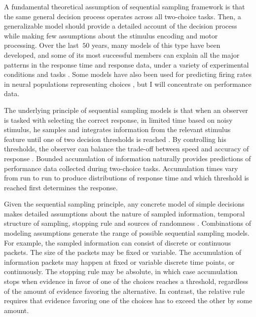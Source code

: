 \documentclass[12pt]{article}
\begin{document}
	A fundamental theoretical assumption of sequential sampling framework is that the same general decision process operates across all two-choice tasks. Then, a generalizable model should provide a detailed account of the decision process while making few assumptions about the stimulus encoding and motor processing. Over the last $~50$ years, many models of this type have been developed, and some of its most successful members can explain all the major patterns in the response time and response data, under a variety of experimental conditions and tasks \citep{Sto1960,Rat1978,RatTue2002,Smi1995,UshMcc2001,BroHea2008}. Some models have also been used for predicting firing rates in neural populations representing choices \citep{RatChe2003,RatHas2011,SmiRat2004,Bog2007}, but I will concentrate on performance data.
    
	The underlying principle of sequential sampling models is that when an observer is tasked with selecting the correct response, in limited time based on noisy stimulus, he samples and integrates information from the relevant stimulus feature until one of two decision thresholds is reached \citep{Sto1960,Edw1965,Pik1973,Rat1978,UshMcc2001,RatSmi2004,SmiRat2004,RatMck2008,Wag2009,Luc1986,TowAsh1983,BogRaf2006}. By controlling his thresholds, the observer can balance the trade-off between speed and accuracy of response \citep{BogWag2010}. Bounded accumulation of information naturally provides predictions of performance data collected during two-choice tasks. Accumulation times vary from run to run to produce distributions of response time and which threshold is reached first determines the response.
    
	Given the sequential sampling principle, any concrete model of simple decisions makes detailed assumptions about the nature of sampled information, temporal structure of sampling, stopping rule and sources of randomness \citep{RatSmi2004,BogRaf2006,TeoUsh2013}. Combinations of modeling assumptions generate the range of possible sequential sampling models. For example, the sampled information can consist of discrete or continuous packets. The size of the packets may be fixed or variable. The accumulation of information packets may happen at fixed or variable discrete time points, or continuously. The stopping rule may be absolute, in which case accumulation stops when evidence in favor of one of the choices reaches a threshold, regardless of the amount of evidence favoring the alternative. In contrast, the relative rule requires that evidence favoring one of the choices has to exceed the other by some amount.
    
\end{document}
